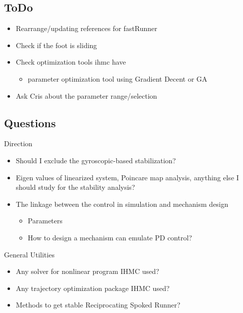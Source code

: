 \subsection{ToDo}
\begin{itemize}
\item Rearrange/updating references for fastRunner
\item Check if the foot is sliding
\item Check optimization tools ihmc have
\begin{itemize}
\item parameter optimization tool using Gradient Decent or GA
\end{itemize}
\item Ask Cris about the parameter range/selection
\end{itemize}

\subsection{Questions}
Direction
\begin{itemize}
\item Should I exclude the gyroscopic-based stabilization? 
\item Eigen values of linearized system, Poincare map analysis, anything else I should study for the stability analysis?
\item The linkage between the control in simulation and mechanism design
	\begin{itemize}
	\item Parameters
	\item How to design a mechanism can emulate PD control?
	\end{itemize}
\end{itemize}
General Utilities 
\begin{itemize}
\item Any solver for nonlinear program IHMC used?
\item Any trajectory optimization package IHMC used?
\item Methods to get stable Reciprocating Spoked Runner?
\end{itemize}

